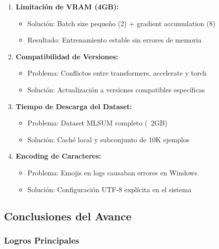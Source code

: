 \documentclass[12pt,a4paper]{article}
\begin{document}
\begin{enumerate}
    \item \textbf{Limitación de VRAM (4GB):}
    \begin{itemize}
        \item Solución: Batch size pequeño (2) + gradient accumulation (8)
        \item Resultado: Entrenamiento estable sin errores de memoria
    \end{itemize}
    
    \item \textbf{Compatibilidad de Versiones:}
    \begin{itemize}
        \item Problema: Conflictos entre transformers, accelerate y torch
        \item Solución: Actualización a versiones compatibles específicas
    \end{itemize}
    
    \item \textbf{Tiempo de Descarga del Dataset:}
    \begin{itemize}
        \item Problema: Dataset MLSUM completo (~2GB)
        \item Solución: Caché local y subconjunto de 10K ejemplos
    \end{itemize}
    
    \item \textbf{Encoding de Caracteres:}
    \begin{itemize}
        \item Problema: Emojis en logs causaban errores en Windows
        \item Solución: Configuración UTF-8 explícita en el sistema
    \end{itemize}
\end{enumerate}

\newpage

\subsection{Conclusiones del Avance}

\subsubsection{Logros Principales}
\end{document}
